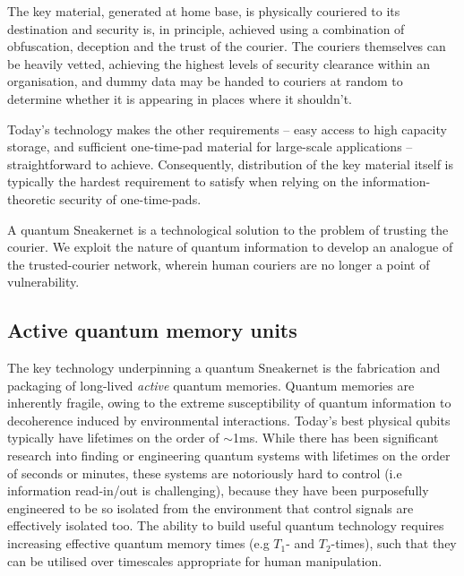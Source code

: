 \documentclass[twocolumn, aps, rmp, amsmath, amssymb, nofootinbib, superscriptaddress, longbibliography, floatfix, table-of-contents, eqsecnum]{revtex4-2}
\begin{document}
The key material, generated at home base, is physically couriered to its destination and security is, in principle, achieved using a combination of obfuscation, deception and the trust of the courier. The couriers themselves can be heavily vetted, achieving the highest levels of security clearance within an organisation, and dummy data may be handed to couriers at random to determine whether it is appearing in places where it shouldn't. 

Today's technology makes the other requirements -- easy access to high capacity storage, and sufficient one-time-pad material for large-scale applications -- straightforward to achieve. Consequently, distribution of the key material itself is typically the hardest requirement to satisfy when relying on the information-theoretic security of one-time-pads.

A quantum Sneakernet is a technological solution to the problem of trusting the courier. We exploit the nature of quantum information to develop an analogue of the trusted-courier network, wherein human couriers are no longer a point of vulnerability. 

\subsection{Active quantum memory units}

The key technology underpinning a quantum Sneakernet is the fabrication and packaging of long-lived \textit{active} quantum memories. Quantum memories are inherently fragile, owing to the extreme susceptibility of quantum information to decoherence induced by environmental interactions. Today's best physical qubits typically have lifetimes on the order of $\sim$1ms. While there has been significant research into finding or engineering quantum systems with lifetimes on the order of seconds or minutes, these systems are notoriously hard to control (i.e information read-in/out is challenging), because they have been purposefully engineered to be so isolated from the environment that control signals are effectively isolated too. The ability to build useful quantum technology requires increasing effective quantum memory times (e.g $T_1$- and $T_2$-times), such that they can be utilised over timescales appropriate for human manipulation. 
\end{document}
